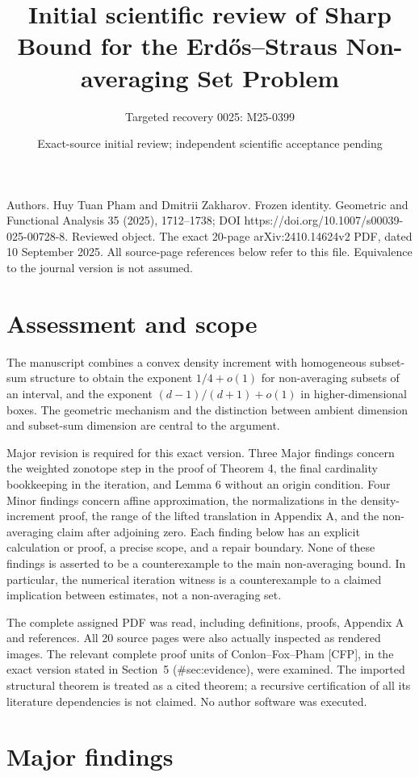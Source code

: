 \documentclass[10pt]{article}
\title{Initial scientific review of
Sharp Bound for the Erdős–Straus Non-averaging Set Problem}
\author{Targeted recovery 0025: M25-0399}
\date{Exact-source initial review; independent scientific acceptance pending}
\begin{document}
\maketitle
Authors. Huy Tuan Pham and Dmitrii Zakharov. Frozen identity. Geometric and Functional Analysis 35 (2025), 1712–1738; DOI https://doi.org/10.1007/s00039-025-00728-8. Reviewed object. The exact 20-page arXiv:2410.14624v2 PDF, dated 10 September 2025. All source-page references below refer to this file. Equivalence to the journal version is not assumed.\par
\section*{Assessment and scope}
The manuscript combines a convex density increment with homogeneous subset-sum structure to obtain the exponent \(1/4+o(1)\) for non-averaging subsets of an interval, and the exponent \((d-1)/(d+1)+o(1)\) in higher-dimensional boxes. The geometric mechanism and the distinction between ambient dimension and subset-sum dimension are central to the argument.\par
Major revision is required for this exact version. Three Major findings concern the weighted zonotope step in the proof of Theorem 4, the final cardinality bookkeeping in the iteration, and Lemma 6 without an origin condition. Four Minor findings concern affine approximation, the normalizations in the density-increment proof, the range of the lifted translation in Appendix A, and the non-averaging claim after adjoining zero. Each finding below has an explicit calculation or proof, a precise scope, and a repair boundary. None of these findings is asserted to be a counterexample to the main non-averaging bound. In particular, the numerical iteration witness is a counterexample to a claimed implication between estimates, not a non-averaging set.\par
The complete assigned PDF was read, including definitions, proofs, Appendix A and references. All 20 source pages were also actually inspected as rendered images. The relevant complete proof units of Conlon–Fox–Pham [CFP], in the exact version stated in Section 5 (\#sec:evidence), were examined. The imported structural theorem is treated as a cited theorem; a recursive certification of all its literature dependencies is not claimed. No author software was executed.\par
\section*{Major findings}
\end{document}
